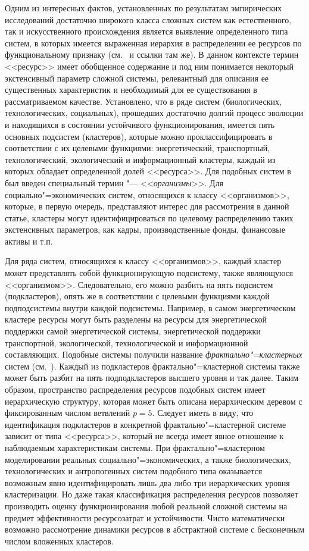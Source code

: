 Одним из интересных фактов, установленных по результатам
эмпирических исследований достаточно широкого класса сложных
систем как естественного, так и искусственного происхождения
является выявление определенного типа систем, в которых имеется
выраженная иерархия в распределении ее ресурсов по функциональному
признаку
(см.~\cite{zubarev_volov:bib:Volov1,zubarev_volov:bib:Volov2} и
ссылки там же). В данном контексте термин <<ресурс>> имеет
обобщенное содержание и под ним понимается некоторый экстенсивный
параметр сложной системы, релевантный для описания ее существенных
характеристик и необходимый для ее существования в рассматриваемом
качестве. Установлено, что в ряде систем (биологических,
технологических, социальных), прошедших достаточно долгий процесс
эволюции и находящихся в состоянии устойчивого функционирования,
имеется пять основных подсистем (кластеров), которые можно
проклассифицировать в соответствии с их целевыми функциями:
энергетический, транспортный, технологический, экологический и
информационный кластеры, каждый из которых обладает определенной
долей <<ресурса>>. Для подобных систем в  был введен специальный
термин "--- <<{\sl организмы}>>. Для социально"=экономических
систем, относящихся к классу <<организмов>>, которые, в первую
очередь, представляют интерес для рассмотрения в данной статье,
кластеры могут идентифицироваться по целевому распределению таких
экстенсивных параметров, как кадры, производственные фонды,
финансовые активы и т.п.

Для ряда систем, относящихся к классу <<организмов>>, каждый
кластер может представлять собой функционирующую подсистему,
также являющуюся <<организмом>>. Следовательно, его можно разбить
на пять подсистем (подкластеров), опять же в соответствии с
целевыми функциями каждой подподсистемы внутри каждой подсистемы.
Например, в самом энергетическом кластере ресурсы могут быть
разделены на ресурсы для энергетической поддержки самой
энергетической системы, энергетической поддержки транспортной,
экологической, технологической и информационной составляющих.
Подобные системы получили название {\sl фрактально"=кластерных}
систем
(см.~\cite{zubarev_volov:bib:Volov1,zubarev_volov:bib:Volov2}).
Каждый из подкластеров фрактально"=кластерной системы также может
быть разбит на пять подподкластеров высшего уровня и так далее.
Таким образом, пространство распределения ресурсов подобных систем
имеет иерархическую структуру, которая может быть описана
иерархическим деревом с фиксированным числом ветвлений $p=5$.
Следует иметь в виду, что идентификация подкластеров в конкретной
фрактально"=кластерной системе зависит от типа <<ресурса>>,
который не всегда имеет явное  отношение к наблюдаемым
характеристикам системы. При фрактально"=кластерном моделировании
реальных социально"=экономических, а также биологических,
технологических и антропогенных систем подобного типа оказывается
возможным явно идентифицировать лишь два либо три иерархических
уровня кластеризации. Но даже такая классификация распределения
ресурсов позволяет производить оценку функционирования любой
реальной сложной системы на предмет эффективности ресурсозатрат и
устойчивости. Чисто математически возможно рассмотрение динамики
ресурсов в абстрактной системе с бесконечным числом вложенных
кластеров.

